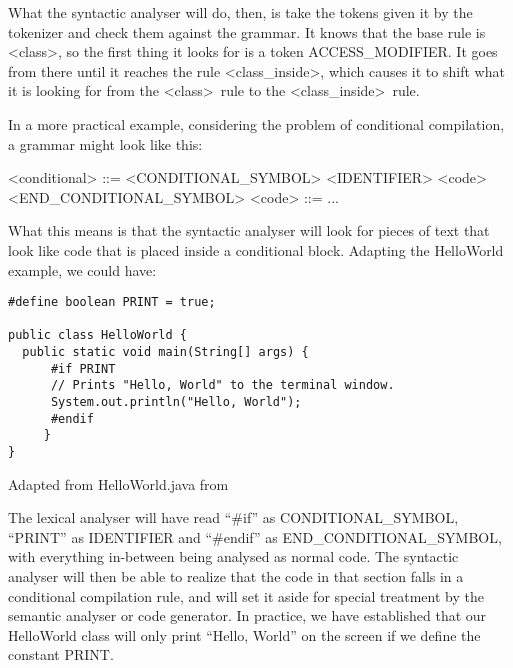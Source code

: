 What the syntactic analyser will do, then, is take the tokens given it by the tokenizer and check them against the grammar. It knows that the base rule is \textless class\textgreater , so the first thing it looks for is a token ACCESS_MODIFIER. It goes from there until it reaches the rule \textless class_inside\textgreater , which causes it to shift what it is looking for from the \textless class\textgreater \ rule to the \textless class_inside\textgreater \ rule.

In a more practical example, considering the problem of conditional compilation, a grammar might look like this:

\begin{listing}
\begin{grammar}
<conditional> ::= <CONDITIONAL_SYMBOL> <IDENTIFIER> <code> <END_CONDITIONAL_SYMBOL>
\alt <code> ::= ...
\end{grammar}
\end{listing}

What this means is that the syntactic analyser will look for pieces of text that look like code that is placed inside a conditional block. Adapting the HelloWorld example, we could have:

\begin{listing}
\begin{verbatim}
#define boolean PRINT = true;

public class HelloWorld {
  public static void main(String[] args) {
      #if PRINT
      // Prints "Hello, World" to the terminal window.
      System.out.println("Hello, World");
      #endif
     }
}
\end{verbatim}
\caption{Adapted from HelloWorld.java from \cite{SEDGEWICK:2011}} \label{lst:helloworldjavaconditional}
\end{listing}

The lexical analyser will have read ``\#if'' as CONDITIONAL_SYMBOL, ``PRINT'' as IDENTIFIER and ``\#endif'' as END_CONDITIONAL_SYMBOL, with everything in-between being analysed as normal code. The syntactic analyser will then be able to realize that the code in that section falls in a conditional compilation rule, and will set it aside for special treatment by the semantic analyser or code generator. In practice, we have established that our HelloWorld class will only print ``Hello, World'' on the screen if we define the constant PRINT.

